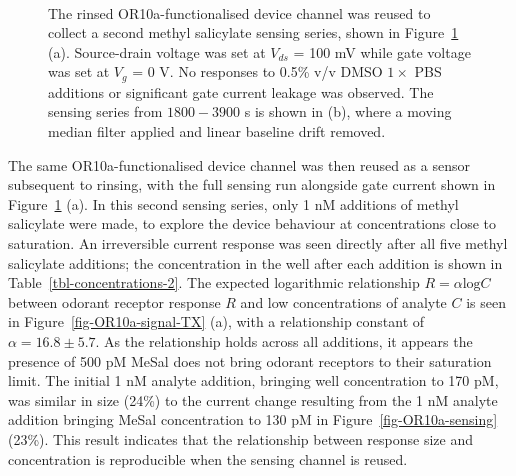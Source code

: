 \documentclass[
  a4paper,
]{scrbook}
\begin{document}
\begin{figure}
\begin{minipage}[t]{0.70\linewidth}
{{}

}

\end{minipage}%
%
\begin{minipage}[t]{0.15\linewidth}

{\centering 

~

}

\end{minipage}%

\caption{\label{fig-OR10a-responses}The rinsed OR10a-functionalised
device channel was reused to collect a second methyl salicylate sensing
series, shown in Figure~\ref{fig-OR10a-responses} (a). Source-drain
voltage was set at \(V_{ds}\) = 100 mV while gate voltage was set at
\(V_g\) = 0 V. No responses to 0.5\% v/v DMSO \(1 \times\) PBS additions
or significant gate current leakage was observed. The sensing series
from \(1800-3900\) s is shown in (b), where a moving median filter
applied and linear baseline drift removed.}

\end{figure}

The same OR10a-functionalised device channel was then reused as a sensor
subsequent to rinsing, with the full sensing run alongside gate current
shown in Figure~\ref{fig-OR10a-responses} (a). In this second sensing
series, only 1 nM additions of methyl salicylate were made, to explore
the device behaviour at concentrations close to saturation. An
irreversible current response was seen directly after all five methyl
salicylate additions; the concentration in the well after each addition
is shown in Table~\ref{tbl-concentrations-2}. The expected logarithmic
relationship \(R = \alpha\textrm{log}C\) between odorant receptor
response \(R\) and low concentrations of analyte \(C\) is seen in
Figure~\ref{fig-OR10a-signal-TX} (a), with a relationship constant of
\(\alpha =16.8\pm5.7\). As the relationship holds across all additions,
it appears the presence of 500 pM MeSal does not bring odorant receptors
to their saturation limit. The initial 1 nM analyte addition, bringing
well concentration to 170 pM, was similar in size (24\%) to the current
change resulting from the 1 nM analyte addition bringing MeSal
concentration to 130 pM in Figure~\ref{fig-OR10a-sensing} (23\%). This
result indicates that the relationship between response size and
concentration is reproducible when the sensing channel is reused.
\end{document}
